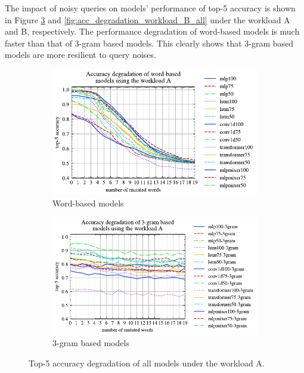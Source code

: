 \documentclass[conference]{IEEEtran}
\begin{document}
The impact of noisy queries on models' performance of top-5 accuracy is shown in Figure \ref{fig:acc_degradation_workload_A_all} and \ref{fig:acc_degradation_workload_B_all}  under  the workload A and B, respectively. The performance degradation of word-based models is much faster than that of 3-gram based models. This clearly shows that 3-gram based models are more resilient to query noises.
\begin{figure}[!th]
	\centering
	\begin{subfigure}[t]{0.95\textwidth}
		\includegraphics[]{graphics/acc_degradation_word_based_A.pdf}
		\caption{Word-based models}
		\label{fig:acc_degradation_workload_A_word_based}
	\end{subfigure}
	\vfill
	\begin{subfigure}[t]{0.95\textwidth}
		\includegraphics[]{graphics/acc_degradation_3gram_based_A.pdf}
		\caption{3-gram based models}
		\label{fig:acc_degradation_workload_A_3gram}
	\end{subfigure}
	\caption{Top-5 accuracy degradation of all models under the workload A.}
	\label{fig:acc_degradation_workload_A_all}
\end{figure}
\end{document}
